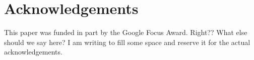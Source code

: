 \documentclass{sig-alternate}
\begin{document}
\section{Acknowledgements}
This paper was funded in part by the Google Focus Award. Right?? What else should we say here? I am writing to fill some space and reserve it for the actual acknowledgements.
%

%
%
\end{document}
